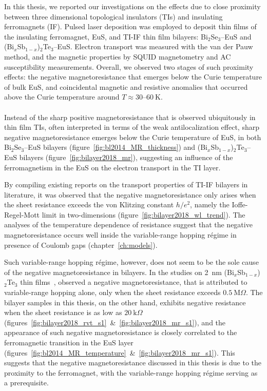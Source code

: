 In this thesis, we reported our investigations on the effects due to close proximity between three dimensional topological insulators (TIs) and insulating ferromagnets (IF). Pulsed laser deposition was employed to deposit thin films of the insulating ferromagnet, EuS, and TI-IF thin film bilayers: Bi$_2$Se$_3$--EuS and (Bi$_x$Sb$_{1-x}$)$_2$Te$_3$--EuS. Electron transport was measured with the van der Pauw method, and the magnetic properties by SQUID magnetometry and AC susceptibility measurements. Overall, we observed two stages of such proximity effects: the negative magnetoresistance that emerges below the Curie temperature of bulk EuS, and coincidental magnetic and resistive anomalies that occurred above the Curie temperature around $T\approx30$--$60~\mathrm{K}$.

\paragraph{}
Instead of the sharp positive magnetoresistance that is observed ubiquitously in thin film TIs, often interpreted in terms of the weak antilocalization effect, sharp negative magnetoresistance emerges below the Curie temperature of EuS, in both Bi$_2$Se$_3$--EuS bilayers (figure~\ref{fig:bl2014_MR_thickness}) and (Bi$_x$Sb$_{1-x}$)$_2$Te$_3$--EuS bilayers (figure~\ref{fig:bilayer2018_mr}), suggesting an influence of the ferromagnetism in the EuS on the electron transport in the TI layer.

By compiling existing reports on the transport properties of TI-IF bilayers in literature, it was observed that the negative magnetoresistance only arises when the sheet resistance exceeds the von Klitzing constant $h / e^2$, namely the Ioffe-Regel-Mott limit in two-dimensions (figure~\ref{fig:bilayer2018_wl_trend}). The analyses of the temperature dependence of resistance suggest that the negative magnetoresistance occurs well inside the variable-range hopping r\'egime in presence of Coulomb gaps (chapter~\ref{ch:models}).

Such variable-range hopping r\'egime, however, does not seem to be the sole cause of the negative magnetoresistance in bilayers. In the studies on \SI{2}{nm} (Bi$_x$Sb$_{1-x}$)$_2$Te$_3$ thin films~\cite{liao2015}, \citeauthor{liao2015} observed a negative magnetoresistance, that is attributed to variable-range hopping alone, only when the sheet resistance exceeds $0.5~\textrm{M}\Omega$. The bilayer samples in this thesis, on the other hand, exhibits negative resistance when the sheet resistance is as low as $20~\textrm{k}\Omega$ (figures~\ref{fig:bilayer2018_rvt_s1}~\&~\ref{fig:bilayer2018_mr_s1}), and the appearance of such negative magnetoresistance is closely correlated to the ferromagnetic transition in the EuS layer (figures~\ref{fig:bl2014_MR_temperature}~\&~\ref{fig:bilayer2018_mr_s1}). This suggests that the negative magnetoresistance discussed in this thesis is due to the proximity to the ferromagnet, with the variable-range hopping r\'egime serving as a prerequisite.

